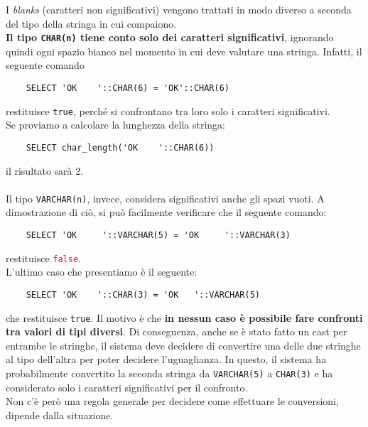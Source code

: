 \documentclass[12pt,a4paper]{book}
\begin{document}
	\begin{tcolorbox}[enhanced jigsaw, breakable, title=Approfondimento: blank characters, title filled]
	I \textit{blanks} (caratteri non significativi) vengono trattati in modo diverso a seconda del tipo della stringa in cui compaiono.\\
	\textbf{Il tipo \texttt{CHAR(n)} tiene conto solo dei caratteri significativi}, ignorando quindi ogni spazio bianco nel momento in cui deve valutare una stringa. Infatti, il seguente comando
	\begin{lstlisting}
	SELECT 'OK    '::CHAR(6) = 'OK'::CHAR(6)
	\end{lstlisting}
	restituisce \textcolor{dkgreen}{\texttt{true}}, perché si confrontano tra loro solo i caratteri significativi.\\Se proviamo a calcolare la lunghezza della stringa:
	\begin{lstlisting}
	SELECT char_length('OK    '::CHAR(6))
	\end{lstlisting}
	il risultato sarà 2.\\ \\
	Il tipo \texttt{VARCHAR(n)}, invece, considera significativi anche gli  spazi vuoti. A dimostrazione di ciò, si può facilmente verificare che il seguente comando: 
	\begin{lstlisting}
	SELECT 'OK     '::VARCHAR(5) = 'OK     '::VARCHAR(3)
	\end{lstlisting}
	restituisce \textcolor{crimson}{\texttt{false}}.\\L'ultimo caso che presentiamo è il seguente:
	\begin{lstlisting}
	SELECT 'OK    '::CHAR(3) = 'OK   '::VARCHAR(5)
	\end{lstlisting}
	che restituisce \textcolor{dkgreen}{\texttt{true}}. Il motivo è che \textbf{in nessun caso è possibile fare confronti tra valori di tipi diversi}. Di conseguenza, anche se è stato fatto un cast per entrambe le stringhe, il sistema deve decidere di convertire una delle due stringhe al tipo dell'altra per poter decidere l'uguaglianza. In questo, il sistema ha probabilmente convertito la seconda stringa da \texttt{VARCHAR(5)} a \texttt{CHAR(3)} e ha considerato solo i caratteri significativi per il confronto.\\Non c'è però una regola generale per decidere come effettuare le conversioni, dipende dalla situazione. 
	\end{tcolorbox}
\end{document}
